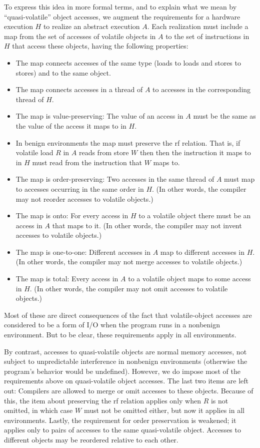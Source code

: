 \documentclass[10]{article}
\begin{document}
To express this idea in more formal terms,
and to explain what we mean by ``quasi-volatile'' object accesses,
we augment the
requirements for a hardware execution $H$ to realize an abstract
execution $A$.
Each realization must include a map from the set of accesses of
volatile objects in $A$ to the set of instructions in $H$ that access
these objects, having the following properties:
\begin{itemize}
\item	The map connects accesses of the same type (loads to loads
	and stores to stores) and to the same object.
\item	The map connects accesses in a thread of $A$ to accesses in
	the corresponding thread of $H$.
\item	The map is value-preserving: The value of an access in $A$ must be
	the same as the value of the access it maps to in $H$.
\item	In benign environments the map must preserve the rf relation.
	That is, if volatile load $R$ in $A$ reads from store $W$ then
	then the instruction it maps to in $H$ must read from the
	instruction that $W$ maps to.
\item	The map is order-preserving: Two accesses in the same thread
	of $A$ must map to accesses occurring in the same order in $H$.
	(In other words, the compiler may not reorder accesses
	to volatile objects.)
\item	The map is onto: For every access in $H$ to a volatile object
	there must be an access in $A$ that maps to it.
	(In other words, the compiler may not invent accesses to
	volatile objects.)
\item	The map is one-to-one: Different accesses in $A$ map to
	different accesses in $H$.
	(In other words, the compiler may not merge accesses to
	volatile objects.)
\item	The map is total: Every access in $A$ to a volatile object
	maps to some access in $H$.
	(In other words, the compiler may not omit accesses to
	volatile objects.)
\end{itemize}
Most of these are direct consequences of the fact that volatile-object
accesses are considered to be a form of I/O when the program runs
in a nonbenign environment.
But to be clear, these requirements apply in all environments.

By contrast, accesses to quasi-volatile objects are normal memory
accesses, not subject to unpredictable interference in nonbenign
environments (otherwise the program's behavior would be undefined).
However, we do impose most of the requirements above on quasi-volatile
object accesses.
The last two items are left out: Compilers are allowed to merge or
omit accesses to these objects.
Because of this, the item about preserving the rf relation
applies only when $R$ is not omitted, in which case $W$ must not
be omitted either, but now it applies in all environments.
Lastly, the requirement for order preservation is weakened; it applies
only to pairs of accesses to the same quasi-volatile object.
Accesses to different objects may be reordered relative to each other.
\end{document}
